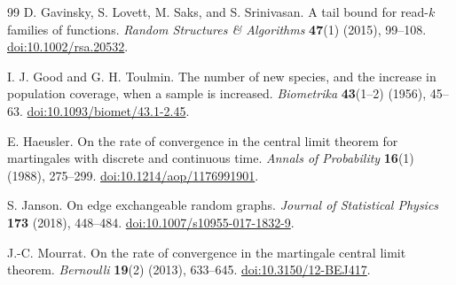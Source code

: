 \documentclass[11pt]{article}
\numberwithin{equation}{section}
\theoremstyle{definition}
\theoremstyle{remark}
\begin{document}
\begin{thebibliography}{99}
D. Gavinsky, S. Lovett, M. Saks, and S. Srinivasan.
A tail bound for read-$k$ families of functions.
\emph{Random Structures \& Algorithms} \textbf{47}(1) (2015), 99--108.
\href{https://doi.org/10.1002/rsa.20532}{doi:10.1002/rsa.20532}.

I. J. Good and G. H. Toulmin.
The number of new species, and the increase in population coverage, when a
sample is increased.
\emph{Biometrika} \textbf{43}(1--2) (1956), 45--63.
\href{https://doi.org/10.1093/biomet/43.1-2.45}{doi:10.1093/biomet/43.1-2.45}.

E. Haeusler.
On the rate of convergence in the central limit theorem for martingales with
discrete and continuous time.
\emph{Annals of Probability} \textbf{16}(1) (1988), 275--299.
\href{https://doi.org/10.1214/aop/1176991901}{doi:10.1214/aop/1176991901}.

S. Janson.
On edge exchangeable random graphs.
\emph{Journal of Statistical Physics} \textbf{173} (2018), 448--484.
\href{https://doi.org/10.1007/s10955-017-1832-9}{doi:10.1007/s10955-017-1832-9}.

J.-C. Mourrat.
On the rate of convergence in the martingale central limit theorem.
\emph{Bernoulli} \textbf{19}(2) (2013), 633--645.
\href{https://doi.org/10.3150/12-BEJ417}{doi:10.3150/12-BEJ417}.

\end{thebibliography}
\end{document}
